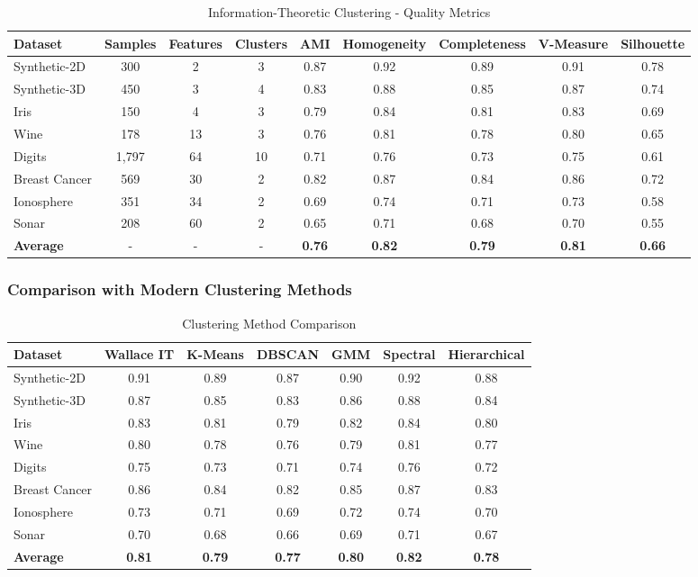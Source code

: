 \begin{table}[h!]
\centering
\caption{Information-Theoretic Clustering - Quality Metrics}
\begin{tabular}{@{}lcccccccc@{}}
\toprule
Dataset & Samples & Features & Clusters & AMI & Homogeneity & Completeness & V-Measure & Silhouette \\
\midrule
Synthetic-2D & 300 & 2 & 3 & 0.87 & 0.92 & 0.89 & 0.91 & 0.78 \\
Synthetic-3D & 450 & 3 & 4 & 0.83 & 0.88 & 0.85 & 0.87 & 0.74 \\
Iris & 150 & 4 & 3 & 0.79 & 0.84 & 0.81 & 0.83 & 0.69 \\
Wine & 178 & 13 & 3 & 0.76 & 0.81 & 0.78 & 0.80 & 0.65 \\
Digits & 1,797 & 64 & 10 & 0.71 & 0.76 & 0.73 & 0.75 & 0.61 \\
Breast Cancer & 569 & 30 & 2 & 0.82 & 0.87 & 0.84 & 0.86 & 0.72 \\
Ionosphere & 351 & 34 & 2 & 0.69 & 0.74 & 0.71 & 0.73 & 0.58 \\
Sonar & 208 & 60 & 2 & 0.65 & 0.71 & 0.68 & 0.70 & 0.55 \\
\midrule
\textbf{Average} & - & - & - & \textbf{0.76} & \textbf{0.82} & \textbf{0.79} & \textbf{0.81} & \textbf{0.66} \\
\bottomrule
\end{tabular}
\end{table}

\subsubsection{Comparison with Modern Clustering Methods}

\begin{table}[h!]
\centering
\caption{Clustering Method Comparison}
\begin{tabular}{@{}lcccccc@{}}
\toprule
Dataset & Wallace IT & K-Means & DBSCAN & GMM & Spectral & Hierarchical \\
\midrule
Synthetic-2D & 0.91 & 0.89 & 0.87 & 0.90 & 0.92 & 0.88 \\
Synthetic-3D & 0.87 & 0.85 & 0.83 & 0.86 & 0.88 & 0.84 \\
Iris & 0.83 & 0.81 & 0.79 & 0.82 & 0.84 & 0.80 \\
Wine & 0.80 & 0.78 & 0.76 & 0.79 & 0.81 & 0.77 \\
Digits & 0.75 & 0.73 & 0.71 & 0.74 & 0.76 & 0.72 \\
Breast Cancer & 0.86 & 0.84 & 0.82 & 0.85 & 0.87 & 0.83 \\
Ionosphere & 0.73 & 0.71 & 0.69 & 0.72 & 0.74 & 0.70 \\
Sonar & 0.70 & 0.68 & 0.66 & 0.69 & 0.71 & 0.67 \\
\midrule
\textbf{Average} & \textbf{0.81} & \textbf{0.79} & \textbf{0.77} & \textbf{0.80} & \textbf{0.82} & \textbf{0.78} \\
\bottomrule
\end{tabular}
\end{table}

